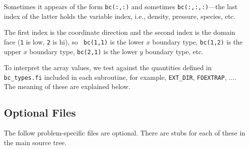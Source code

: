\begin{itemize}
\begin{itemize}
    Sometimes it appears of the form {\tt bc(:,:)} and sometimes
    {\tt bc(:,:,:)}---the last index of the latter holds the variable
    index, i.e., density, pressure, species, etc.

    The first index is the coordinate direction and the second index
    is the domain face ({\tt 1} is low, {\tt 2} is hi), so {\tt
    bc(1,1)} is the lower $x$ boundary type, {\tt bc(1,2)} is
    the upper $x$ boundary type, {\tt bc(2,1)} is the lower
    $y$ boundary type, etc.

    To interpret the array values, we test against the quantities
    defined in {\tt bc\_types.fi} included in each subroutine,
    for example, {\tt EXT\_DIR}, {\tt FOEXTRAP}, $\ldots$.  The
    meaning of these are explained below.

  \end{itemize}

\end{itemize}


\subsection{Optional Files}

The follow problem-specific files are optional.  There are stubs for
each of these in the main source tree.  


